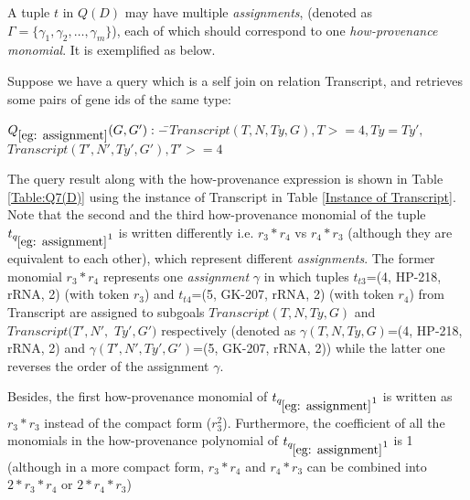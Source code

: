 
 
A tuple $t$ in $Q(D)$ may have multiple {\em assignments}, (denoted as $\Gamma = \{\gamma_1, \gamma_2, \dots, \gamma_m\}$), each of which should correspond to one {\em how-provenance monomial}. It is exemplified as below.


\begin{example} \label{eg: assignment}
Suppose we have a query which is a self join on relation Transcript, and retrieves some pairs of gene ids of the same type:
\begin{tabbing}
$Q_{\ref{eg: assignment}}(G, G') :- $\=$Transcript(T, N, Ty, G), T >= 4, Ty = Ty',$\\
\>$Transcript(T', N', Ty', G'), T' >= 4$
\end{tabbing}

The query result along with the how-provenance expression is shown in Table \ref{Table:Q7(D)} using the instance of Transcript in Table \ref{Instance of Transcript}. Note that the second and the third how-provenance monomial of the tuple $t_{q_{\ref{eg: assignment}}1}$ is written differently i.e. $r_3*r_4$ vs $r_4*r_3$ (although they are equivalent to each other), which represent different {\em assignments}. The former monomial $r_3*r_4$ represents one {\em assignment} $\gamma$ in which tuples $t_{t3}$=(4, HP-218, rRNA, 2) (with token $r_3$) and $t_{t4}$=(5, GK-207, rRNA, 2) (with token $r_4$) from Transcript are assigned to subgoals $Transcript(T, N, Ty, G)$ and $Transcript(T', N',$ $ Ty', G')$ respectively (denoted as $\gamma(T, N, Ty, G)$=(4, HP-218, rRNA, 2) and $\gamma(T', N', Ty', G')$=(5, GK-207, rRNA, 2)) while the latter one reverses the order of the assignment $\gamma$. 

Besides, the first how-provenance monomial of $t_{q_{\ref{eg: assignment}}1}$ is written as $r_3*r_3$ instead of the compact form ($r_3^2$).  Furthermore, the coefficient of all the monomials in the how-provenance polynomial of $t_{q_{\ref{eg: assignment}}1}$ is 1 (although in a more compact form, $r_3*r_4$ and $r_4*r_3$ can be combined into $2*r_3*r_4$ or $2*r_4*r_3$)



\end{example}
